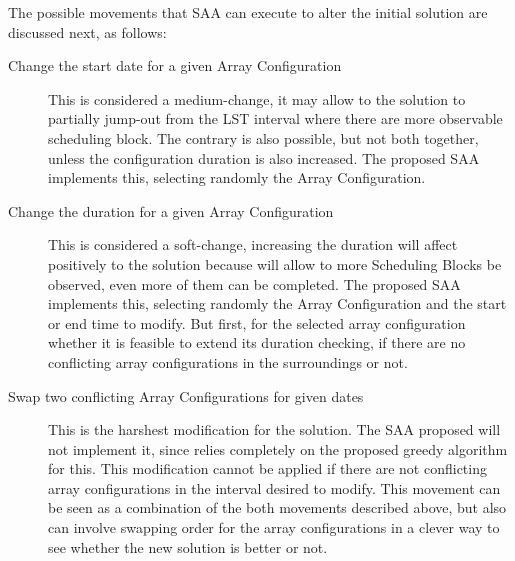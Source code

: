 The possible movements that SAA can execute to alter the initial solution are discussed next, as follows:
\begin{description}
\item[Change the start date for a given Array Configuration] This is considered a medium-change, it may allow to the solution to partially jump-out from the LST interval where there are more observable scheduling block. The contrary is also possible, but not both together, unless the configuration duration is also increased. The proposed SAA implements this, selecting randomly the Array Configuration.

\item[Change the duration for a given Array Configuration] This is considered a soft-change, increasing the duration will affect positively to the solution because will allow to more Scheduling Blocks be observed, even more of them can be completed. The proposed SAA implements this, selecting randomly the Array Configuration and the start or end time to modify. But first, for the selected array configuration whether it is feasible to extend its duration checking, if there are no conflicting array configurations in the surroundings or not.

\item[Swap two conflicting Array Configurations for given dates] This is the harshest modification for the solution. The SAA proposed will not implement it, since relies completely on the proposed greedy algorithm for this. This modification cannot be applied if there are not conflicting array configurations in the interval desired to modify. This movement can be seen as a combination of the both movements described above, but also can involve swapping order for the array configurations in a clever way to see whether the new solution is better or not.
\end{description}

